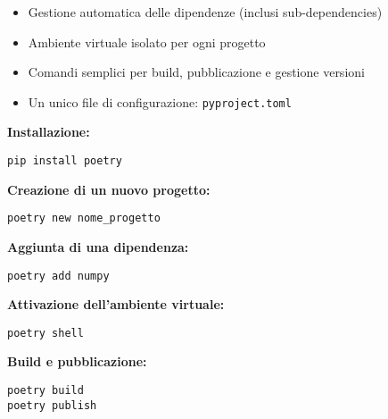 \documentclass[a4paper,12pt]{article}
\begin{document}
\begin{itemize}
    \item Gestione automatica delle dipendenze (inclusi sub-dependencies)
    \item Ambiente virtuale isolato per ogni progetto
    \item Comandi semplici per build, pubblicazione e gestione versioni
    \item Un unico file di configurazione: \texttt{pyproject.toml}
\end{itemize}

\textbf{Installazione:}
\begin{lstlisting}
pip install poetry
\end{lstlisting}

\textbf{Creazione di un nuovo progetto:}
\begin{lstlisting}
poetry new nome_progetto
\end{lstlisting}

\textbf{Aggiunta di una dipendenza:}
\begin{lstlisting}
poetry add numpy
\end{lstlisting}

\textbf{Attivazione dell'ambiente virtuale:}
\begin{lstlisting}
poetry shell
\end{lstlisting}

\textbf{Build e pubblicazione:}
\begin{lstlisting}
poetry build
poetry publish
\end{lstlisting}
\end{document}
